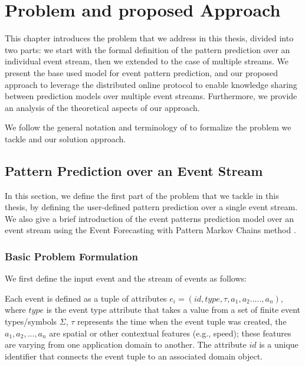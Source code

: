 \chapter{Problem and proposed Approach }

\label{chapter:system}

\par This chapter introduces the problem that we address in this thesis, divided into two parts: we start with the formal definition of the pattern prediction over an individual event stream, then we extended to the case of multiple streams. We present the base used model for event pattern prediction, and our proposed approach to leverage the distributed online protocol to enable knowledge sharing between prediction models over multiple event streams. Furthermore, we provide an analysis of the theoretical aspects of our approach.

\par We follow the general notation and terminology of \cite{agrawal2008efficient,schultz2009distributed,luckham2008power,alevizos2015complex,zhou_pattern_2015,kamp2014communication} to formalize the problem we tackle and our solution approach.


\section{Pattern Prediction over an Event Stream}


In this section, we define the first part of the problem that we tackle in this thesis, by defining the user-defined pattern prediction over a single event stream. We also give a brief introduction of the event patterns prediction model over an event stream using the Event Forecasting with Pattern Markov Chains method \cite{alevizos2017event}.


\subsection{Basic Problem Formulation}

We first define the input event and the stream of events as follows:  
\begin{definition}
	Each event is defined as a tuple of attributes $e_i = (id,type,\tau,a_1,a_2.....,a_n)$, where $type$ is the event type attribute that takes a value from a set of finite event types/symbols $\Sigma$, $\tau$ represents the time when the event tuple was created,  the  $a_1,a_2,...,a_n$ are spatial or other contextual features (e.g., speed); these features are varying from one application domain to another. The attribute $id$ is a unique identifier that connects the event tuple to an associated domain object.
\end{definition}

